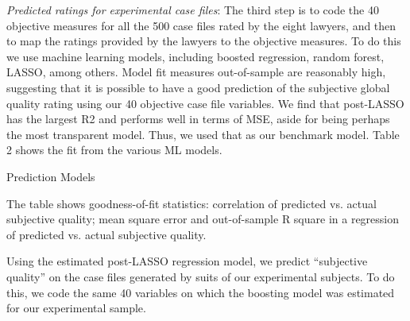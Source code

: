 \documentclass[oneside,12pt]{article}
\begin{document}
\emph{Predicted ratings for experimental case files}: The third step is to code the 40 objective measures for all the 500 case files rated by the eight lawyers, and then to map the ratings provided by the lawyers to the objective measures. To do this we use machine learning models, including boosted regression, random forest, LASSO, among others. Model fit measures out-of-sample are reasonably high, suggesting that it is possible to have a good prediction of the subjective global quality rating using our 40 objective case file variables. We find that post-LASSO has the largest R2 and performs well in terms of MSE, aside for being perhaps the most transparent model. Thus, we used that as our benchmark model. Table 2 shows the fit from the various ML models. 
\\

\begin{table}[!ht]
    \caption{Prediction Models}
    \label{tab:2_pred}
    \begin{center}
    \footnotesize{}
    \end{center}
    \scriptsize {The table shows goodness-of-fit statistics: correlation of predicted vs. actual subjective quality; mean square error and out-of-sample R square in a regression of predicted vs. actual subjective quality.}

  
\end{table}



Using the estimated post-LASSO regression model, we predict “subjective quality” on the case files generated by suits of our experimental subjects. To do this, we code the same 40 variables on which the boosting model was estimated for our experimental sample. 
\end{document}
